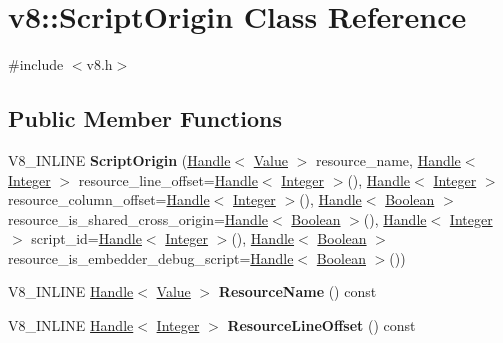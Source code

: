 \hypertarget{classv8_1_1_script_origin}{}\section{v8\+:\+:Script\+Origin Class Reference}
\label{classv8_1_1_script_origin}


{\ttfamily \#include $<$v8.\+h$>$}

\subsection*{Public Member Functions}
\begin{DoxyCompactItemize}
\item 
\hypertarget{classv8_1_1_script_origin_a925d3cd446c495551460265f4817ee21}{}V8\+\_\+\+I\+N\+L\+I\+N\+E {\bfseries Script\+Origin} (\hyperlink{classv8_1_1_handle}{Handle}$<$ \hyperlink{classv8_1_1_value}{Value} $>$ resource\+\_\+name, \hyperlink{classv8_1_1_handle}{Handle}$<$ \hyperlink{classv8_1_1_integer}{Integer} $>$ resource\+\_\+line\+\_\+offset=\hyperlink{classv8_1_1_handle}{Handle}$<$ \hyperlink{classv8_1_1_integer}{Integer} $>$(), \hyperlink{classv8_1_1_handle}{Handle}$<$ \hyperlink{classv8_1_1_integer}{Integer} $>$ resource\+\_\+column\+\_\+offset=\hyperlink{classv8_1_1_handle}{Handle}$<$ \hyperlink{classv8_1_1_integer}{Integer} $>$(), \hyperlink{classv8_1_1_handle}{Handle}$<$ \hyperlink{classv8_1_1_boolean}{Boolean} $>$ resource\+\_\+is\+\_\+shared\+\_\+cross\+\_\+origin=\hyperlink{classv8_1_1_handle}{Handle}$<$ \hyperlink{classv8_1_1_boolean}{Boolean} $>$(), \hyperlink{classv8_1_1_handle}{Handle}$<$ \hyperlink{classv8_1_1_integer}{Integer} $>$ script\+\_\+id=\hyperlink{classv8_1_1_handle}{Handle}$<$ \hyperlink{classv8_1_1_integer}{Integer} $>$(), \hyperlink{classv8_1_1_handle}{Handle}$<$ \hyperlink{classv8_1_1_boolean}{Boolean} $>$ resource\+\_\+is\+\_\+embedder\+\_\+debug\+\_\+script=\hyperlink{classv8_1_1_handle}{Handle}$<$ \hyperlink{classv8_1_1_boolean}{Boolean} $>$())\label{classv8_1_1_script_origin_a925d3cd446c495551460265f4817ee21}

\item 
\hypertarget{classv8_1_1_script_origin_a289502d71720ca10e53b4a32d9226f58}{}V8\+\_\+\+I\+N\+L\+I\+N\+E \hyperlink{classv8_1_1_handle}{Handle}$<$ \hyperlink{classv8_1_1_value}{Value} $>$ {\bfseries Resource\+Name} () const \label{classv8_1_1_script_origin_a289502d71720ca10e53b4a32d9226f58}

\item 
\hypertarget{classv8_1_1_script_origin_a0735178b8afef9169a3481cf6cd7c557}{}V8\+\_\+\+I\+N\+L\+I\+N\+E \hyperlink{classv8_1_1_handle}{Handle}$<$ \hyperlink{classv8_1_1_integer}{Integer} $>$ {\bfseries Resource\+Line\+Offset} () const \label{classv8_1_1_script_origin_a0735178b8afef9169a3481cf6cd7c557}


\end{DoxyCompactItemize}
